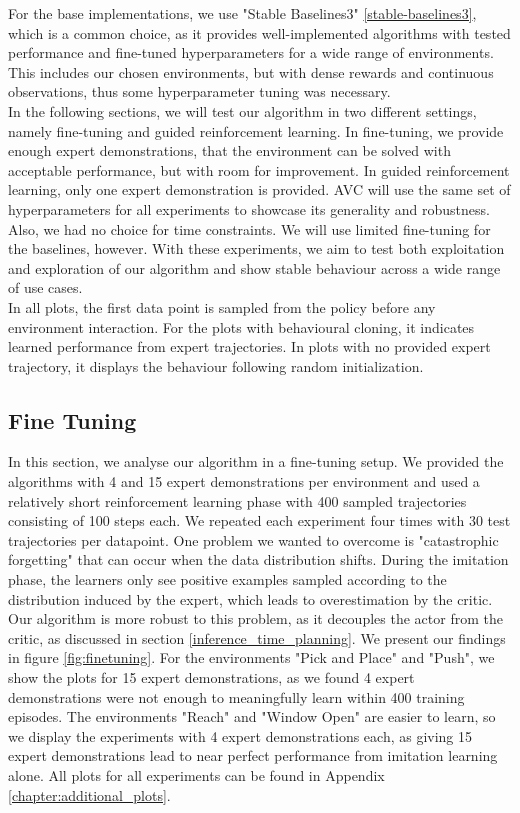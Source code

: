 For the base implementations, we use "Stable Baselines3" \ref{stable-baselines3}, which is a common choice, as it provides well-implemented algorithms with tested
performance and fine-tuned hyperparameters for a wide range of environments. This includes our chosen environments, but with dense rewards and continuous observations,
thus some hyperparameter tuning was necessary. \\

In the following sections, we will test our algorithm in two different settings, namely fine-tuning and guided reinforcement learning. In fine-tuning, we provide
enough expert demonstrations, that the environment can be solved with acceptable performance, but with room for improvement. In guided reinforcement learning,
only one expert demonstration is provided. AVC will use the same set of hyperparameters for all experiments to showcase its generality and robustness. Also, we had no choice for time constraints.
We will use limited fine-tuning for the baselines, however.
With these experiments, we aim to test both exploitation and exploration of our algorithm and show stable
behaviour across a wide range of use cases. \\

In all plots, the first data point is sampled from the policy before any environment interaction. For the plots with behavioural cloning, it indicates learned performance from expert trajectories.
In plots with no provided expert trajectory, it displays the behaviour following random initialization.


\subsection{Fine Tuning}
\label{sec:fine_tuning}
In this section, we analyse our algorithm in a fine-tuning setup. We provided the algorithms with 4 and 15 expert demonstrations per 
environment and used a relatively short reinforcement learning phase with 400 sampled trajectories consisting of 100 steps each. We 
repeated each experiment four times with 30 test trajectories per datapoint. One problem we wanted to overcome is "catastrophic forgetting" 
that can occur when the data distribution shifts. During the imitation phase, the learners only see positive examples sampled according to 
the distribution induced by the expert, which leads to overestimation by the critic. Our algorithm is more robust to this problem, as it 
decouples the actor from the critic, as discussed in section \ref{inference_time_planning}. We present our findings in figure \ref{fig:finetuning}. 
For the environments "Pick and Place" and "Push", we show the plots for 15 expert demonstrations, as we found 4 expert demonstrations were not 
enough to meaningfully learn within 400 training episodes. The environments "Reach" and "Window Open" are easier to learn, so we display the 
experiments with 4 expert demonstrations each, as giving 15 expert demonstrations lead to near perfect performance from imitation learning alone. 
All plots for all experiments can be found in Appendix \ref{chapter:additional_plots}.\\

